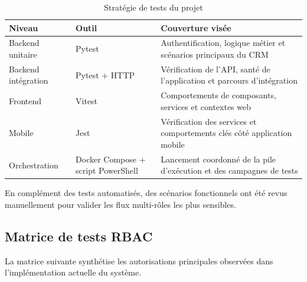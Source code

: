 \begin{table}[H]
\centering
\caption{Stratégie de tests du projet}
\label{tab:strategie_tests}
\begin{tabularx}{\textwidth}{|l|l|X|}
\hline
\textbf{Niveau} & \textbf{Outil} & \textbf{Couverture visée} \\
\hline
Backend unitaire & Pytest & Authentification, logique métier et scénarios principaux du CRM \\
\hline
Backend intégration & Pytest + HTTP & Vérification de l'API, santé de l'application et parcours d'intégration \\
\hline
Frontend & Vitest & Comportements de composants, services et contextes web \\
\hline
Mobile & Jest & Vérification des services et comportements clés côté application mobile \\
\hline
Orchestration & Docker Compose + script PowerShell & Lancement coordonné de la pile d'exécution et des campagnes de tests \\
\hline
\end{tabularx}
\end{table}

En complément des tests automatisés, des scénarios fonctionnels ont été revus manuellement pour valider les flux multi-rôles les plus sensibles.

\subsection{Matrice de tests RBAC}
La matrice suivante synthétise les autorisations principales observées dans l'implémentation actuelle du système.

